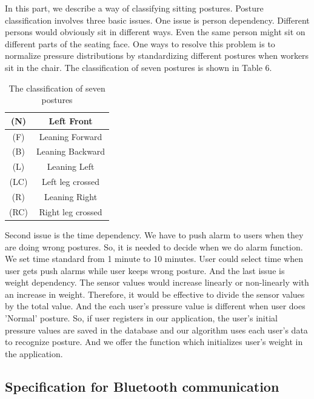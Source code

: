 \documentclass[conference]{IEEEtran}
\begin{document}
In this part, we describe a way of classifying sitting postures. Posture classification involves three basic issues. One issue is person dependency. Different persons would obviously sit in different ways. Even the same person might sit on different parts of the seating face. One ways to resolve this problem is to normalize pressure distributions by standardizing different postures when workers sit in the chair. The classification of seven postures is shown in Table 6.

 \begin{table}[h]
{\renewcommand\arraystretch{1.25}
\caption{The classification of seven postures}
\begin{tabular}{|c|cc}  \hline\hline
(N)& \multicolumn{2}{p{7cm}|}{\raggedright Left Front} \\ \hline
(F)& \multicolumn{2}{p{7cm}|}{\raggedright Leaning Forward} \\ \hline
(B)& \multicolumn{2}{p{7cm}|}{\raggedright Leaning Backward} \\ \hline
(L)& \multicolumn{2}{p{7cm}|}{\raggedright Leaning Left} \\ \hline
(LC)& \multicolumn{2}{p{7cm}|}{\raggedright Left leg crossed} \\ \hline 
(R)& \multicolumn{2}{p{7cm}|}{\raggedright Leaning Right} \\ \hline
(RC)& \multicolumn{2}{p{7cm}|}{\raggedright Right leg crossed} \\ \hline \hline
\end{tabular}}
\end{table}



Second issue is the time dependency. We have to push alarm to users when they are doing wrong postures. So, it is needed to decide when we do alarm function. We set time standard from 1 minute to 10 minutes. User could select time when user gets push alarms while user keeps wrong posture. 
   And the last issue is weight dependency. The sensor values would increase linearly or non-linearly with an increase in weight. Therefore, it would be effective to divide the sensor values by the total value. And the each user's pressure value is different when user does 'Normal' posture. So, if user registers in our application, the user's initial pressure values are saved in the database and our algorithm uses each user's data to recognize posture. And we offer the function which initializes user's weight in the application. 
\subsection{Specification for Bluetooth communication}
\end{document}
